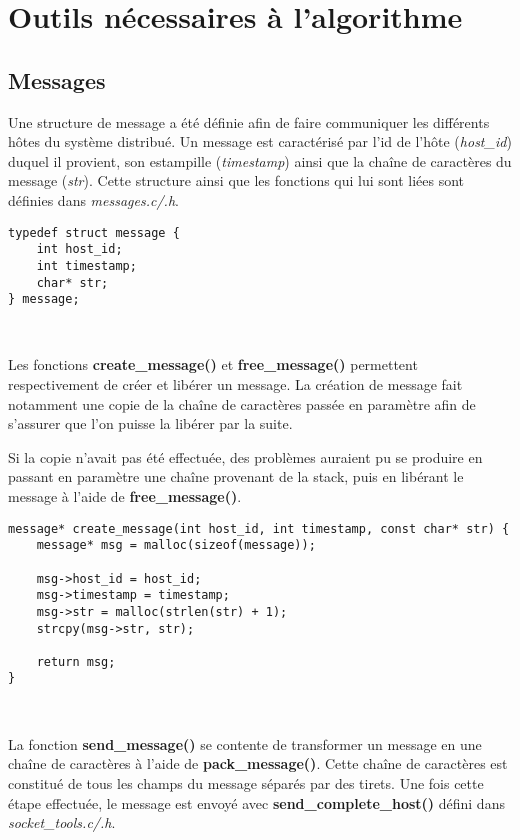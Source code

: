 \section{Outils nécessaires à l'algorithme}
\subsection{Messages}
Une structure de message a été définie afin de faire communiquer les différents hôtes du système distribué. Un message est caractérisé par l'id de l'hôte (\emph{host\_id}) duquel il provient, son estampille (\emph{timestamp}) ainsi que la chaîne de caractères du message (\emph{str}). Cette structure ainsi que les fonctions qui lui sont liées sont définies dans \emph{messages.c/.h}.\\

\begin{lstlisting}
typedef struct message {
	int host_id;
	int timestamp;
	char* str;
} message;
\end{lstlisting}
\

Les fonctions \textbf{create\_message()} et \textbf{free\_message()} permettent respectivement de créer et libérer un message. La création de message fait notamment une copie de la chaîne de caractères passée en paramètre afin de s'assurer que l'on puisse la libérer par la suite.

\begin{framewarning}
Si la copie n'avait pas été effectuée, des problèmes auraient pu se produire en passant en paramètre une chaîne provenant de la stack, puis en libérant le message à l'aide de \textbf{free\_message()}.
\end{framewarning}

\begin{lstlisting}
message* create_message(int host_id, int timestamp, const char* str) {
	message* msg = malloc(sizeof(message));

	msg->host_id = host_id;
	msg->timestamp = timestamp;
	msg->str = malloc(strlen(str) + 1);
	strcpy(msg->str, str);

	return msg;
}
\end{lstlisting}
\

La fonction \textbf{send\_message()} se contente de transformer un message en une chaîne de caractères à l'aide de \textbf{pack\_message()}. Cette chaîne de caractères est constitué de tous les champs du message séparés par des tirets. Une fois cette étape effectuée, le message est envoyé avec \textbf{send\_complete\_host()} défini dans \emph{socket\_tools.c/.h}.\\

